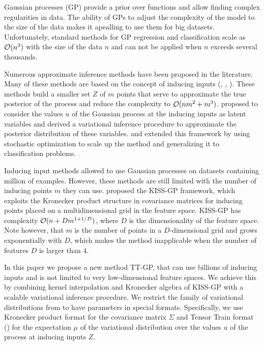 Gaussian processes (GP) provide a prior over functions and allow finding complex
regularities in data. The ability of GPs to adjust the complexity of the model 
to the size of the data makes it apealling to use them for big datasets.
Unfortunately, standard methods for GP regression and classification scale as
$\mathcal{O}(n^3)$ with the size of the data $n$ and can not be applied when $n$ 
exceeds several thousands.

Numerous approximate inference methods have been proposed in the literature. Many
of these methods are based on the concept of inducing inputs (\citet{candela2005},
\citet{snelson2006}, \citet{williams2000}). These methods build a smaller set
$Z$ of $m$ points that serve to approximate the true posterior of the process
and reduce the complexity to $\mathcal{O}(nm^2 + m^3)$. \citet{titsias2009} proposed
to consider the values $u$ of the Gaussian process at the inducing inputs
as latent variables and derived a variational inference procedure to approximate
the posterior distribution of these variables. \citet{hensman2013} and 
\citet{hensman2015} extended this framework by using stochastic optimization to 
scale up the method and generalizing it to classification problems.

Inducing input methods allowed to use Gaussian processes on datasets containing
million of examples. However, these methods are still limited with the number
of inducing points $m$ they can use. \citet{wilson2015} proposed the KISS-GP
framework, which exploits the Kronecker product structure in covariance matrices
for inducing points placed on a multidimensional grid in the feature space. 
KISS-GP has complexity $\mathcal{O}(n + D m^{1 + 1/D})$, where $D$ is the dimensionality
of the feature space. Note however, that $m$ is the number of points in a
$D$-dimensional grid and grows exponentially with $D$, which makes the method 
inapplicable when the number of features $D$ is larger than $4$.

In this paper we propose a new method TT-GP, that can use billions of inducing
inputs and is not limited to very low-dimensional feature spaces. We achieve 
this by combining kernel interpolation and Kronecker algebra of KISS-GP with
a scalable variational inference procedure. We restrict the family of 
variational distributions from \citet{hensman2013} to have parameters in 
special formats. Specifically, we use Kronecker product format for the 
covariance matrix $\Sigma$ and Tensor Train format (\citet{oseledets2011}) for the
expectation $\mu$ of the variational distribution over the values $u$ of the 
process at inducing inputs $Z$. 

